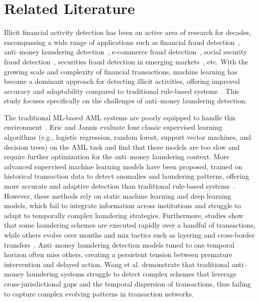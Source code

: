 
\section{Related Literature}
Illicit financial activity detection has been an active area of research for decades, encompassing a wide range of applications such as financial fraud detection~\parencite{fan2025unearthing, yiu2014deterrence, wu2024fair}, anti–money laundering detection~\parencite{deprez2025network}, e-commerce fraud detection~\parencite{nanduri2020microsoft, luca2016fake}, social security fraud detection~\parencite{van2017gotcha}, securities fraud detection in emerging markets~\parencite{guo2022hierarchical}, etc. With the growing scale and complexity of financial transactions, machine learning has become a dominant approach for detecting illicit activities, offering improved accuracy and adaptability compared to traditional rule-based systems~\parencite{august2025impact, fan2025unearthing, cecchini2010detecting, xiao2023black}. This study focuses specifically on the challenges of anti–money laundering detection.

The traditional ML-based AML systems are poorly equipped to handle this environment~\parencite{pettersson2022combating, alotibi2022money, jensen2023fighting, lokanan2024predicting}. Eric and Jannis \parencite*{pettersson2022combating} evaluate four classic supervised learning algorithms (e.g., logistic regression, random forest, support vector machines, and decision trees) on the AML task and find that these models are too slow and require further optimization for the anti–money laundering context. More advanced supervised machine learning models have been proposed, trained on historical transaction data to detect anomalies and laundering patterns, offering more accurate and adaptive detection than traditional rule-based systems~\parencite{golightly2023securing}. However, these methods rely on static machine learning and deep learning models, which fail to integrate information across institutions and struggle to adapt to temporally complex laundering strategies. Furthermore, studies show that some laundering schemes are executed rapidly over a handful of transactions, while others evolve over months and mix tactics such as layering and cross-border transfers~\parencite{amoako2025exploring}. Anti–money laundering detection models tuned to one temporal horizon often miss others, creating a persistent tension between premature intervention and delayed action. Wang et al. \parencite*{wang2024temporal} demonstrate that traditional anti–money laundering systems struggle to detect complex schemes that leverage cross-jurisdictional gaps and the temporal dispersion of transactions, thus failing to capture complex evolving patterns in transaction networks. 

